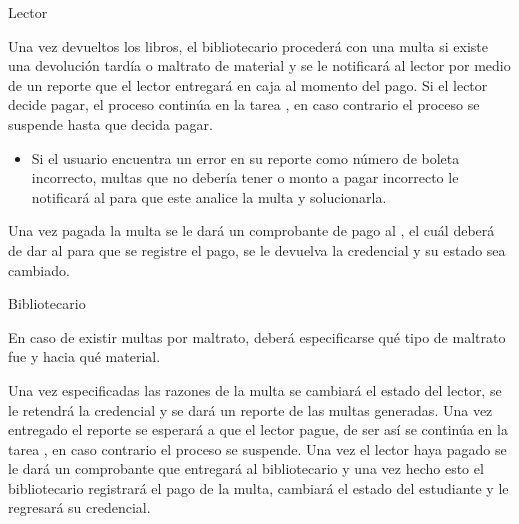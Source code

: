 \begin{PDescripcion}

  \Ppaso Lector

    \begin{enumerate}

      \Ppaso[\itarea]  Una vez devueltos los libros, el bibliotecario procederá con una multa si existe una devolución tardía o maltrato de material y se le notificará al lector por medio de un reporte que el lector entregará  en caja al momento del pago. Si el lector decide pagar, el proceso continúa en la tarea , en caso contrario el proceso se suspende hasta que decida pagar. 
	\begin{itemize}
	  \item Si el usuario encuentra un error en su reporte como número de boleta incorrecto, multas que no debería tener o monto a pagar incorrecto le notificará al   para que este analice la multa y solucionarla.
	\end{itemize}

      \Ppaso[\itarea]  Una vez pagada la multa se le dará un comprobante de pago al , el cuál deberá de dar al  para que se registre el pago, se le devuelva la credencial y su estado sea cambiado. 

    \end{enumerate}

  \Ppaso Bibliotecario

    \begin{enumerate}

      \Ppaso[\itarea]  En caso de existir multas por maltrato, deberá especificarse qué tipo de maltrato fue y hacia qué material. 

      \Ppaso[\itarea]  Una vez especificadas las razones de la multa se cambiará el estado del lector, se le retendrá la credencial y se dará un reporte de las multas generadas. Una vez entregado el reporte se esperará a que el lector pague, de ser así se continúa en la tarea , en caso contrario el proceso se suspende. 
       \Ppaso[\itarea]  Una vez el lector haya pagado se le dará un comprobante que entregará al bibliotecario y una vez hecho esto el bibliotecario registrará el pago de la multa, cambiará el estado del estudiante y le regresará su credencial. 
    \end{enumerate}

\end{PDescripcion}

